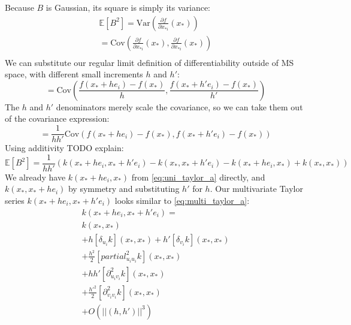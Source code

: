 Because $B$ is Gaussian, its square is simply its variance:
\begin{equation*}
    \begin{aligned}
        \mathbb{E}[B^2] = \text{Var}\left(\frac{\partial f}{\partial x_{*i}}(x_*)\right) \\
        = \text{Cov} \left(\frac{\partial f}{\partial x_{*i}}(x_*), \frac{\partial f}{\partial x_{*i}}(x_*) \right) \\
    \end{aligned}
\end{equation*}
We can substitute our regular limit definition of differentiability outside of MS space, with different small increments $h$ and $h'$:
\begin{equation*}
    = \text{Cov} \left(\frac{f(x_* + h e_i) - f(x_*)}{h}, \frac{f(x_* + h' e_i) - f(x_*)}{h'} \right)
\end{equation*}
The $h$ and $h'$ denominators merely scale the covariance, so we can take them out of the covariance expression:
\begin{equation*}
    = \frac{1}{hh'} \text{Cov} \left(f(x_* + h e_i) - f(x_*), f(x_* + h' e_i) - f(x_*) \right)
\end{equation*}
Using additivity TODO explain:
\begin{equation*}
    \mathbb{E}[B^2] = \frac{1}{hh'} \left( k(x_* + h e_i, x_* + h' e_i) - k(x_*, x_* + h' e_i) - k(x_* + h e_i, x_*) + k(x_*, x_*) \right)
\end{equation*}
We already have $k(x_* + h e_i, x_*)$ from \ref{eq:uni_taylor_a} directly, and $k(x_*, x_* + h e_i)$ by symmetry and substituting $h'$ for $h$. Our multivariate Taylor series $k(x_* + h e_i, x_* + h' e_i)$ looks similar to \ref{eq:multi_taylor_a}:
\begin{equation*}
    \begin{aligned}
        k(x_* + h e_i, x_* + h' e_i) = \\
        k(x_*, x_*) \\
        + h [\delta_{u_i}k](x_*, x_*) 
        + h' [\delta_{v_i}k](x_*, x_*) \\
        + \frac{h^2}{2} [partial_{u_i u_i}^2k](x_*, x_*) \\
        + hh' [\partial_{u_i v_i}^2k](x_*, x_*) \\
        + \frac{h'^2}{2} [\partial_{v_i v_i}^2k](x_*, x_*) \\
        + O(||(h,h')||^3)
    \end{aligned}
\end{equation*}

